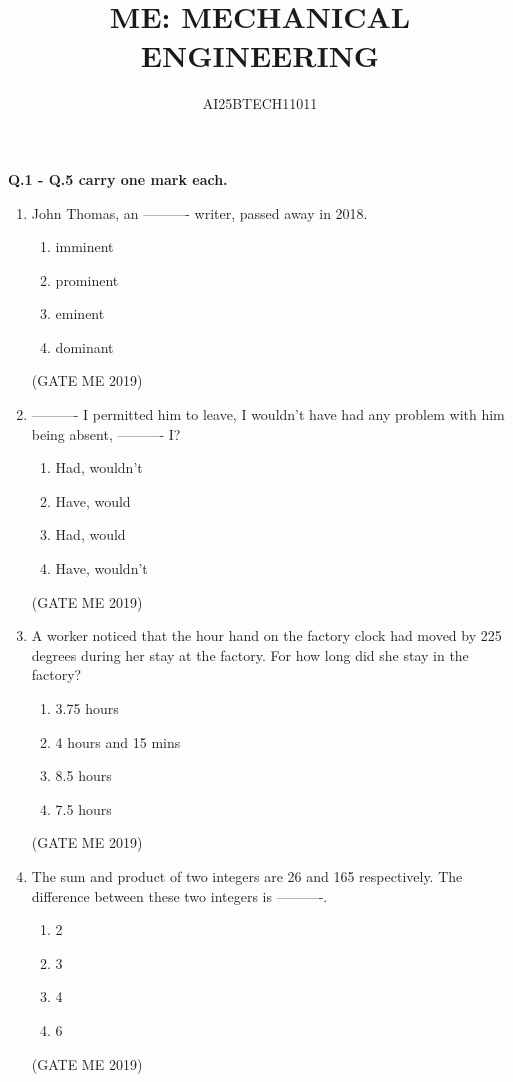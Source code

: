 \documentclass[journal]{IEEEtran}
\begin{document}
\title{
ME: MECHANICAL ENGINEERING}
\author{AI25BTECH11011}
\maketitle
\renewcommand{\thefigure}{\theenumi}
\renewcommand{\thetable}{\theenumi}

\textbf{Q.1 - Q.5 carry one mark each.}
\begin{enumerate}

\item John Thomas, an ---------- writer, passed away in 2018.
\begin{multicols}{2}
\begin{enumerate}
    \item imminent
    \item prominent
    \item eminent
    \item dominant
\end{enumerate}
\end{multicols}
\hfill (GATE ME 2019)

\item ---------- I permitted him to leave, I wouldn't have had any problem with him being absent, ---------- I?
\begin{multicols}{2}
\begin{enumerate}
    \item Had, wouldn't
    \item Have, would
    \item Had, would
    \item Have, wouldn't
\end{enumerate}
\end{multicols}
\hfill (GATE ME 2019)

\item A worker noticed that the hour hand on the factory clock had moved by 225 degrees during her stay at the factory. For how long did she stay in the factory?
\begin{multicols}{2}
\begin{enumerate}
    \item 3.75 hours
    \item 4 hours and 15 mins
    \item 8.5 hours
    \item 7.5 hours
\end{enumerate}
\end{multicols}
\hfill (GATE ME 2019)

\item The sum and product of two integers are 26 and 165 respectively. The difference between these two integers is ----------.
\begin{multicols}{4}
\begin{enumerate}
    \item 2
    \item 3
    \item 4
    \item 6
\end{enumerate}
\end{multicols}
\hfill (GATE ME 2019)


\end{enumerate}
\end{document}
